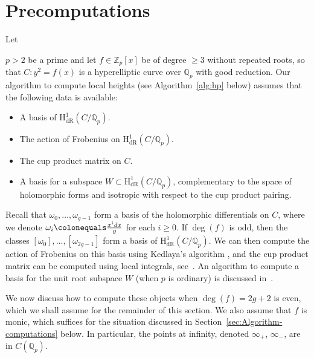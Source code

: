 \documentclass[11pt, a4paper]{amsart}
\newcommand{\Q}{\mathbb{Q}}
\newcommand{\Z}{\mathbb{Z}}
\newcommand{\hdr}{\operatorname{H^1_{dR}}}
\newcommand{\ord}{\operatorname{ord}}
\theoremstyle{remark}
\numberwithin{equation}{section}
\newcommand{\sg}{{}}
\newcommand{\sm}{{}}
\begin{document}
\section{Precomputations}\label{sec:precomp}
Let \sm{$p>2$ be a prime and let $f\in\Z_p[x]$ be of degree $\ge 3$ without repeated roots, so that $C\colon y^2=f(x)$ is a hyperelliptic curve  over $\Q_p$ with good reduction.
Our algorithm to compute local heights (see Algorithm~\ref{alg:hp} below) assumes that the following data is available:
\begin{itemize}
  \item A basis of $\hdr(C/\Q_p)$. 
  \item The action of Frobenius on $\hdr(C/\Q_p)$.
  \item The cup product matrix on $C$.
  \item A basis for  a subspace $W \subset \hdr(C/\Q_p)$, 
    complementary to the space of holomorphic forms and isotropic with respect to the cup product pairing.
\end{itemize}
Recall that $\omega_0,\ldots,\omega_{g-1}$ form a  basis of
the holomorphic differentials on $C$, where  we denote
$\omega_i\colonequals \frac{x^idx}{y}$ for each $i\ge 0$. 
If $\deg(f)$ is odd, then the classes $[\omega_0],\ldots,[\omega_{2g-1}]$ form a basis of 
$\hdr(C/\Q_p)$. We can then compute the action of Frobenius on this basis using
Kedlaya's algorithm \cite{Kedlaya-MW-reduction}, and the cup product matrix can be computed using local integrals, see~\cite[\S5.1]{BBHeights}. An algorithm to compute a basis for the unit root subspace $W$ (when $p$ is ordinary) is discussed in~\cite[\S6.1]{BBHeights}.

We now discuss how to compute these objects when $\deg(f)=2g+2$ is even, which we shall assume for the remainder of this section. We also assume that $f$ is monic, which suffices for the situation discussed in Section~\ref{sec:Algorithm-computations} below.
In particular, the points at infinity, denoted
$\infty_+$, $\infty_-$, are in $C(\Q_p)$. }


\end{document}
